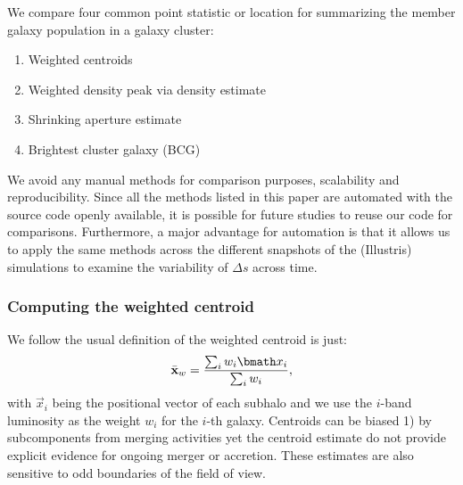 
We compare four common point statistic or location for summarizing 
the member galaxy population in a galaxy cluster:
\begin{enumerate}
\item Weighted centroids
\item Weighted density peak via density estimate  
\item Shrinking aperture estimate
\item Brightest cluster galaxy (BCG)
\end{enumerate}

We avoid any manual methods for
comparison purposes, scalability and reproducibility. 
Since all the methods listed in this
paper are automated with the source code openly available, 
it is possible for future studies to reuse our code for comparisons. 
Furthermore, a major advantage for automation is that it allows us  
to apply
the same methods across the different snapshots of the (Illustris) simulations to
examine the variability of $\Delta s$ across time. 


\subsubsection{Computing the weighted centroid}
\label{subsubsec:weighted_centroid}
We follow the usual definition of the weighted centroid is just: 
\begin{equation}
	\bar{\bf x}_w = \frac{\sum_i w_i \vec{x}_i}{\sum_i w_i},
\end{equation}
with $\vec{x}_i$ being the positional vector of each subhalo 
and we use the $i$-band luminosity 
as the weight $w_i$ for the $i$-th galaxy.
Centroids can be biased 1) by subcomponents from merging activities yet the
centroid estimate do not provide explicit evidence for ongoing merger or 
accretion. These estimates are also sensitive to odd boundaries 
of the field of view.

